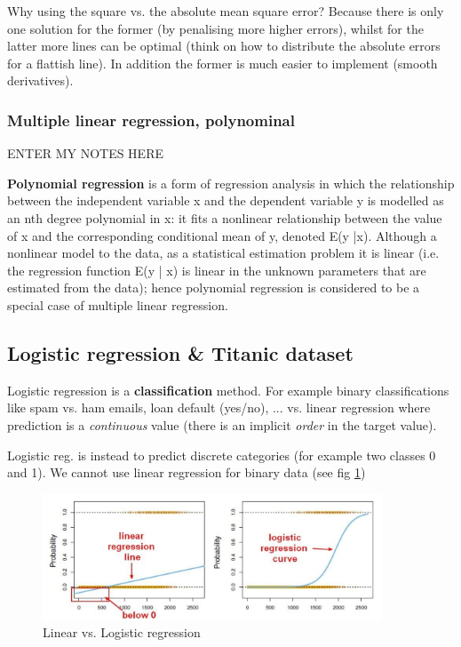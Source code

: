 \documentclass[11pt]{article}
\begin{document}
Why using the square vs. the absolute mean square error? Because there is only one solution for the former (by penalising more higher errors), whilst for the latter more lines can be optimal (think on how to distribute the absolute errors for a flattish line). In addition the former is much easier to implement (smooth derivatives).


\subsubsection{Multiple linear regression, polynominal}
ENTER MY NOTES HERE

\textbf{Polynomial regression} is a form of regression analysis in which the relationship between the independent variable x and the dependent variable y is modelled as an nth degree polynomial in x: it  fits a nonlinear relationship between the value of x and the corresponding conditional mean of y, denoted E(y |x). Although a nonlinear model to the data, as a statistical estimation problem it is linear (i.e. the regression function E(y | x) is linear in the unknown parameters that are estimated from the data); hence polynomial regression is considered to be a special case of multiple linear regression.

\subsection{Logistic regression \& Titanic dataset}
Logistic regression is a \textbf{classification} method. For example binary classifications like spam vs. ham emails, loan default (yes/no), ... 
vs. linear regression where prediction is a \textit{continuous} value (there is an implicit \textit{order} in the target value). 

Logistic reg. is instead to predict discrete categories (for example two classes 0 and 1). We cannot use linear regression for binary data (see fig \ref{lin_log_regr})


\begin{figure}[htbp] 
	\centering
	\includegraphics[width=0.9\textwidth]{pics/logistic_regression}
	\caption{Linear vs. Logistic regression} 
	\label{lin_log_regr}
\end{figure}
\end{document}
